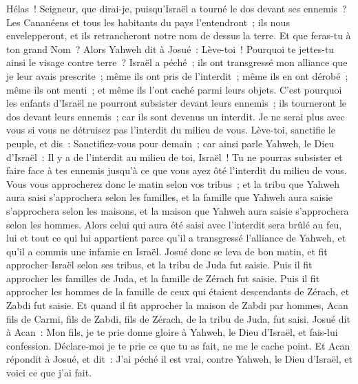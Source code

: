 \begin{multicols}{2}
Hélas~! Seigneur, que dirai-je, puisqu'Israël a tourné le dos devant ses ennemis~?
Les Cananéens et tous les habitants du pays l'entendront~; ils nous envelepperont, et ils retrancheront notre nom de dessus la terre. Et que feras-tu à ton grand Nom~?
Alors Yahweh dit à Josué~: Lève-toi~! Pourquoi te jettes-tu ainsi le visage contre terre~?
Israël a péché~; ils ont transgressé mon alliance que je leur avais prescrite~; même ils ont pris de l'interdit~; même ils en ont dérobé~; même ils ont menti~; et même ils l'ont caché parmi leurs objets.
C'est pourquoi les enfants d'Israël ne pourront subsister devant leurs ennemis~; ils tourneront le dos devant leurs ennemis~; car ils sont devenus un interdit. Je ne serai plus avec vous si vous ne détruisez pas l'interdit du milieu de vous.
Lève-toi, sanctifie le peuple, et dis~: Sanctifiez-vous pour demain~; car ainsi parle Yahweh, le Dieu d'Israël~: Il y a de l'interdit au milieu de toi, Israël~! Tu ne pourras subsister et faire face à tes ennemis jusqu'à ce que vous ayez ôté l'interdit du milieu de vous.
Vous vous approcherez donc le matin selon vos tribus~; et la tribu que Yahweh aura saisi s'approchera selon les familles, et la famille que Yahweh aura saisie s'approchera selon les maisons, et la maison que Yahweh aura saisie s'approchera selon les hommes.
Alors celui qui aura été saisi avec l'interdit sera brûlé au feu, lui et tout ce qui lui appartient parce qu'il a transgressé l'alliance de Yahweh, et qu'il a commis une infamie en Israël.
Josué donc se leva de bon matin, et fit approcher Israël selon ses tribus, et la tribu de Juda fut saisie.
Puis il fit approcher les familles de Juda, et la famille de Zérach fut saisie. Puis il fit approcher les hommes de la famille de ceux qui étaient descendants de Zérach, et Zabdi fut saisie.
Et quand il fit approcher la maison de Zabdi par hommes, Acan fils de Carmi, fils de Zabdi, fils de Zérach, de la tribu de Juda, fut saisi.
Josué dit à Acan~: Mon fils, je te prie donne gloire à Yahweh, le Dieu d'Israël, et fais-lui confession. Déclare-moi je te prie ce que tu as fait, ne me le cache point.
Et Acan répondit à Josué, et dit~: J'ai péché il est vrai, contre Yahweh, le Dieu d'Israël, et voici ce que j'ai fait.

\end{multicols}
